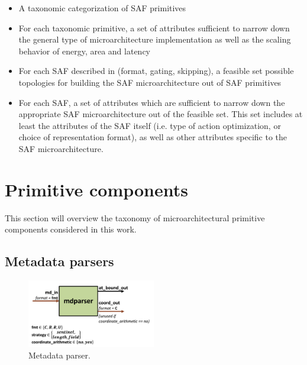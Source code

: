 %
\begin{itemize}
    \item A taxonomic categorization of SAF primitives
    \item For each taxonomic primitive, a set of attributes sufficient to narrow down the general type of microarchitecture implementation as well as the scaling behavior of energy, area and latency
    \item For each SAF described in \cite{sparseloop} (format, gating, skipping), a feasible set possible topologies for building the SAF microarchitecture out of SAF primitives
    \item For each SAF, a set of attributes which are sufficient to narrow down the appropriate SAF microarchitecture out of the feasible set. This set includes at least the attributes of the SAF itself (i.e. type of action optimization, or choice of representation format), as well as other attributes specific to the SAF microarchitecture.
\end{itemize}

\section{Primitive components}

This section will overview the taxonomy of microarchitectural primitive components considered in this work.

\subsection{Metadata parsers}

\begin{figure}[H]
    \centering
    \includegraphics[width=0.5\textwidth]{figures/mdparser.png}
    \caption{Metadata parser.}
    \label{fig:mdparser}
\end{figure}

